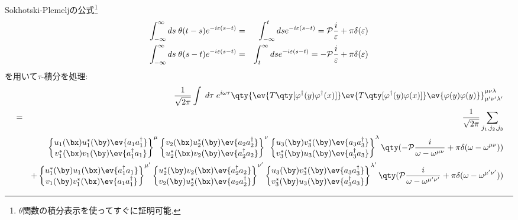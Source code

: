 \documentclass[10.5pt,a4paper]{jreport}
\begin{document}
Sokhotski-Plemeljの公式\footnote{$\theta$関数の積分表示を使ってすぐに証明可能.}
\begin{eqnarray}
  \int_{-\infty}^\infty ds\; \theta(t-s)e^{-i\varepsilon(s-t)} &=& \int_{-\infty}^t ds e^{-i\varepsilon(s-t)} = {\cal P}\frac{i}{\varepsilon} + \pi\delta(\varepsilon)\\
  \int_{-\infty}^\infty ds\; \theta(s-t)e^{-i\varepsilon(s-t)} &=& \int_{t}^{\infty} ds e^{-i\varepsilon(s-t)} = -{\cal P}\frac{i}{\varepsilon} + \pi\delta(\varepsilon)
\end{eqnarray}
を用いて$\tau$-積分を処理:
\begin{eqnarray}
  &&\frac{1}{\sqrt{2\pi}}\int\; d\tau\;e^{i\omega\tau}  \qty{\ev{T\qty[\varphi^\dagger(y)\varphi^\dagger(x)]}\ev{T\qty[\varphi^\dagger(y)\varphi(x)]}\ev{\varphi(y)\varphi(y)}}^{\mu\nu\lambda}_{\mu'\nu'\lambda'}\\
  \nonumber  &=& \frac{1}{\sqrt{2\pi}}\sum_{j_1, j_2, j_3}\\
  \nonumber  && \begin{Bmatrix}
    u_{1}(\bx)u_{1}^*(\by)\ev{a_{1}a_{1}^\dagger}\\
    v_{1}^*(\bx)v_{1}(\by)\ev{a_{1}^\dagger a_{1}}
  \end{Bmatrix}^\mu
  \begin{Bmatrix}
    v_{2}(\bx)u^*_{2}(\by)\ev{a_{2}a_{2}^\dagger}\\
    u^*_{2}(\bx)v_{2}(\by)\ev{a_{2}^\dagger a_{2}}
  \end{Bmatrix}^\nu
  \begin{Bmatrix}
    u_{3}(\by)v^*_{3}(\by)\ev{a_{3}a^\dagger_{3}}\\
    v_{3}^*(\by)u_{3}(\by)\ev{a_{3}^\dagger a_{3}}
  \end{Bmatrix}^\lambda \qty(-{\cal P}\frac{i}{\omega - \omega^{\mu\nu}} + \pi\delta(\omega - \omega^{\mu\nu}))\\
  \nonumber  &&+\begin{Bmatrix}
  u_{1}^*(\by)u_{1}(\bx)\ev{a_{1}^\dagger a_{1}}\\
  v_{1}(\by)v_{1}^*(\bx)\ev{a_{1}a_{1}^\dagger}
  \end{Bmatrix}^{\mu'}
  \begin{Bmatrix}
    u^*_{2}(\by)v_{2}(\bx)\ev{a_{2}^\dagger a_{2}}\\
    v_{2}(\by)u^*_{2}(\bx)\ev{a_{2}a_{2}^\dagger}
  \end{Bmatrix}^{\nu'}
  \begin{Bmatrix}
    u_{3}(\by)v^*_{3}(\by)\ev{a_{3}a^\dagger_{3}}\\
    v_{3}^*(\by)u_{3}(\by)\ev{a_{3}^\dagger a_{3}}
  \end{Bmatrix}^{\lambda'}\qty({\cal P}\frac{i}{\omega - \omega^{\mu'\nu'}} + \pi\delta(\omega - \omega^{\mu'\nu'}))\\
\end{eqnarray}
\end{document}
